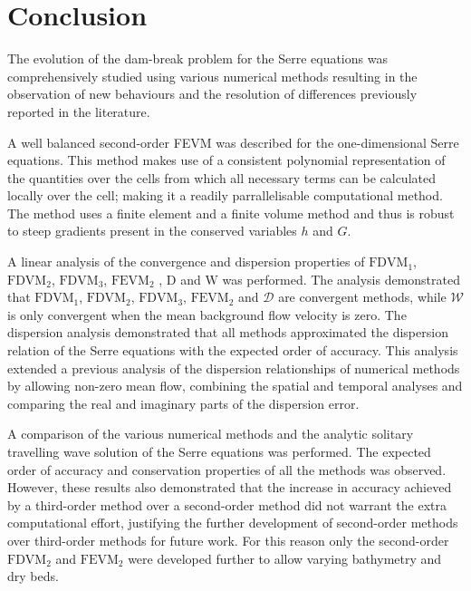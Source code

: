 
\chapter{Conclusion}
\label{chp:Conclusion}



The evolution of the dam-break problem for the Serre equations was comprehensively studied using various numerical methods resulting in the observation of new behaviours and the resolution of differences previously reported in the literature.  

A well balanced second-order FEVM was described for the one-dimensional Serre equations. This method makes use of a consistent polynomial representation of the quantities over the cells from which all necessary terms can be calculated locally over the cell; making it a readily parrallelisable computational method. The method uses a finite element and a finite volume method and thus is robust to steep gradients present in the conserved variables $h$ and $G$. 

A linear analysis of the convergence and dispersion properties of $\text{FDVM}_1$, $\text{FDVM}_2$, $\text{FDVM}_3$, $\text{FEVM}_2$ , $\text{D}$ and $\text{W}$ was performed. The analysis demonstrated that $\text{FDVM}_1$, $\text{FDVM}_2$, $\text{FDVM}_3$, $\text{FEVM}_2$ and $\mathcal{D}$ are convergent methods, while $\mathcal{W}$ is only convergent when the mean background flow velocity is zero. The dispersion analysis demonstrated that all methods approximated the dispersion relation of the Serre equations with the expected order of accuracy. This analysis extended a previous analysis of the dispersion relationships of numerical methods \cite{Filippini-etal-2016-381} by allowing non-zero mean flow, combining the spatial and temporal analyses and comparing the real and imaginary parts of the dispersion error. 

A comparison of the various numerical methods and the analytic solitary travelling wave solution of the Serre equations was performed. The expected order of accuracy and conservation properties of all the methods was observed. However, these results also demonstrated that the increase in accuracy achieved by a third-order method over a second-order method did not warrant the extra computational effort, justifying the further development of second-order methods over third-order methods for future work. For this reason only the second-order $\text{FDVM}_2$ and $\text{FEVM}_2$ were developed further to allow varying bathymetry and dry beds.

